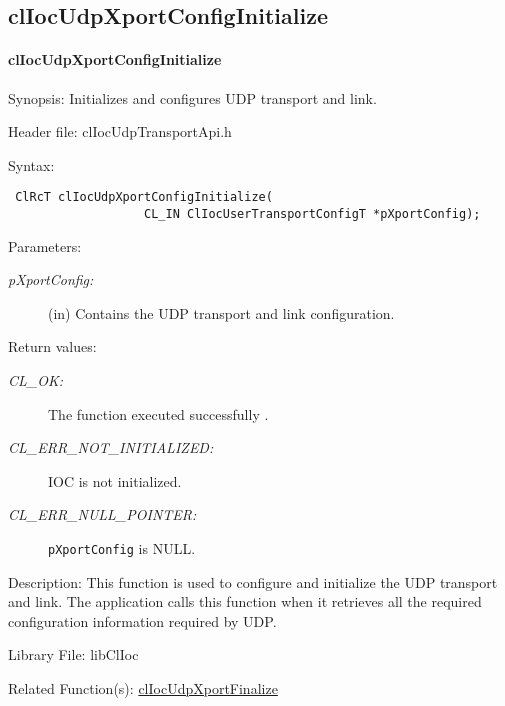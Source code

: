 \begin{flushleft}
\subsection{clIocUdpXportConfigInitialize}
\hypertarget{pageioc401}{}\paragraph{cl\-Ioc\-Udp\-Xport\-Config\-Initialize}\label{pageioc401}
\begin{Desc}
\item[Synopsis:]Initializes and configures UDP transport and link.\end{Desc}
\begin{Desc}
\item[Header file:]clIocUdpTransportApi.h\end{Desc}
\begin{Desc}
\item[Syntax:]

\footnotesize\begin{verbatim} ClRcT clIocUdpXportConfigInitialize(
                   CL_IN ClIocUserTransportConfigT *pXportConfig);
\end{verbatim}
\normalsize
\end{Desc}
\begin{Desc}
\item[Parameters:]
\begin{description}
\item[{\em p\-Xport\-Config:}](in) Contains the UDP transport and link configuration.\end{description}
\end{Desc}
\begin{Desc}
\item[Return values:]
\begin{description}
\item[{\em CL\_\-OK:}]The function executed successfully . \item[{\em CL\_\-ERR\_\-NOT\_\-INITIALIZED:}]IOC is not initialized. 
\item[{\em CL\_\-ERR\_\-NULL\_\-POINTER:}]{\tt{pXportConfig}} is NULL.\end{description}
\end{Desc}
\begin{Desc}
\item[Description: ]This function is used to configure and initialize the UDP transport and link. The application calls this function when it retrieves
all the required configuration information required by UDP.\end{Desc}
\begin{Desc}
\item[Library File:]libClIoc\end{Desc}
\begin{Desc}
\item[Related Function(s):]\hyperlink{pageioc402}{cl\-Ioc\-Udp\-Xport\-Finalize} \end{Desc}
\newpage



\end{flushleft}
